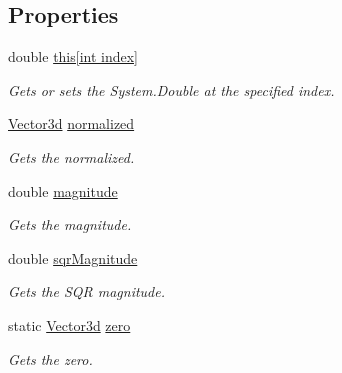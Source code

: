 \subsection*{Properties}
\begin{DoxyCompactItemize}
\item 
double \hyperlink{struct_unity_engine_1_1_vector3d_a2404ef1456e1698870aced7aca401ea1}{this\mbox{[}int index\mbox{]}}
\begin{DoxyCompactList}\small\item\em Gets or sets the System.\+Double at the specified index. \end{DoxyCompactList}\item 
\hyperlink{struct_unity_engine_1_1_vector3d}{Vector3d} \hyperlink{struct_unity_engine_1_1_vector3d_af2eb6813876df8f6a008cc3765b82fb3}{normalized}
\begin{DoxyCompactList}\small\item\em Gets the normalized. \end{DoxyCompactList}\item 
double \hyperlink{struct_unity_engine_1_1_vector3d_aadaa05dc710361cb4c0439d71f8d5fbb}{magnitude}
\begin{DoxyCompactList}\small\item\em Gets the magnitude. \end{DoxyCompactList}\item 
double \hyperlink{struct_unity_engine_1_1_vector3d_a3ba4dc6ef6b28ecfe0029dc8ab4133ea}{sqr\+Magnitude}
\begin{DoxyCompactList}\small\item\em Gets the S\+QR magnitude. \end{DoxyCompactList}\item 
static \hyperlink{struct_unity_engine_1_1_vector3d}{Vector3d} \hyperlink{struct_unity_engine_1_1_vector3d_af21fc14abc86a1564b9d2975d7df5b5e}{zero}
\begin{DoxyCompactList}\small\item\em Gets the zero. \end{DoxyCompactList}\item 

\end{DoxyCompactItemize}
